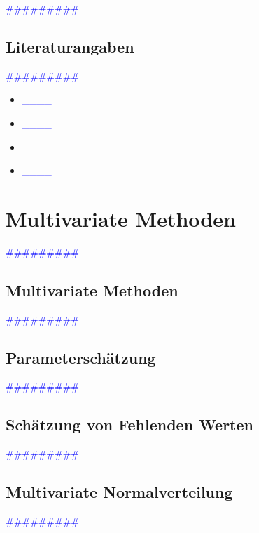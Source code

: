 \documentclass{article}
\begin{document}
      \textcolor{blue}{\#\#\#\#\#\#\#\#\#}
  \subsection{Literaturangaben} %

      \textcolor{blue}{\#\#\#\#\#\#\#\#\#}

      \begin{itemize}
      \color{red}
        \item  \textcolor{blue}{\_\_\_\_} 
        \item  \textcolor{blue}{\_\_\_\_}
      \color{ForestGreen}
        \item  \textcolor{blue}{\_\_\_\_} 
        \item  \textcolor{blue}{\_\_\_\_}
      \end{itemize}



\newpage
\section{Multivariate Methoden} %
      \textcolor{blue}{\#\#\#\#\#\#\#\#\#}
  \subsection{Multivariate Methoden} %
      \textcolor{blue}{\#\#\#\#\#\#\#\#\#}
  \subsection{Parameterschätzung} %
      \textcolor{blue}{\#\#\#\#\#\#\#\#\#}
  \subsection{Schätzung von Fehlenden Werten} %
      \textcolor{blue}{\#\#\#\#\#\#\#\#\#}
  \subsection{Multivariate Normalverteilung} %
      \textcolor{blue}{\#\#\#\#\#\#\#\#\#}
\end{document}
